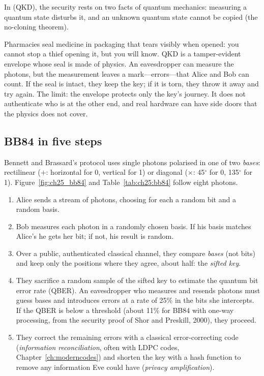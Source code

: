 
In  (QKD), the security rests on two facts of quantum mechanics:
measuring a quantum state disturbs it, and an unknown quantum state cannot be copied (the
no-cloning theorem).

\begin{analogy}
Pharmacies seal medicine in packaging that tears visibly when opened: you cannot stop a thief
opening it, but you will know. QKD is a tamper-evident envelope whose seal is made of physics. An
eavesdropper can measure the photons, but the measurement leaves a mark---errors---that Alice and Bob
can count. If the seal is intact, they keep the key; if it is torn, they throw it away and try again.
The limit: the envelope protects only the key's journey. It does not authenticate who is at the other
end, and real hardware can have side doors that the physics does not cover.
\end{analogy}

\subsection{BB84 in five steps}
Bennett and Brassard's protocol uses single photons polarised in one of two \emph{bases}:
rectilinear ($+$: horizontal for 0, vertical for 1) or diagonal ($\times$: 45$^\circ$ for 0,
135$^\circ$ for 1). Figure~\ref{fig:ch25_bb84} and Table~\ref{tab:ch25:bb84} follow eight photons.
\begin{enumerate}
\item Alice sends a stream of photons, choosing for each a random bit and a random basis.
\item Bob measures each photon in a randomly chosen basis. If his basis matches Alice's he gets her bit;
if not, his result is random.
\item Over a public, authenticated classical channel, they compare \emph{bases} (not bits) and keep
only the positions where they agree, about half: the \emph{sifted key}.
\item They sacrifice a random sample of the sifted key to estimate the quantum bit error rate (QBER).
An eavesdropper who measures and resends photons must guess bases and introduces errors at a rate of
25\% in the bits she intercepts. If the QBER is below a threshold (about 11\% for BB84 with one-way
processing, from the security proof of Shor and Preskill, 2000), they proceed.
\item They correct the remaining errors with a classical error-correcting code
(\emph{information reconciliation}, often with LDPC codes, Chapter~\ref{ch:moderncodes}) and shorten
the key with a hash function to remove any information Eve could have (\emph{privacy amplification}).
\end{enumerate}

